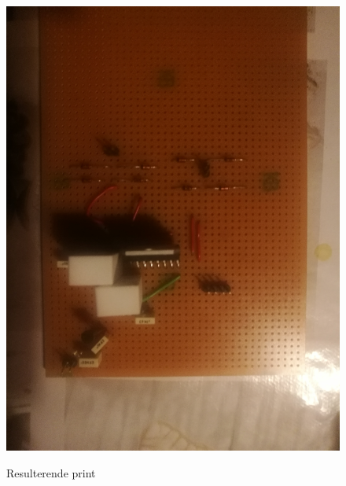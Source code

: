 \begin{figure}[H]
	\centering
	\caption{Resulterende print}
	\includegraphics[scale=0.1,trim=0 0 0 0, clip]{billeder/solderedprint.jpg}
	\label{solderedprint}
\end{figure}
